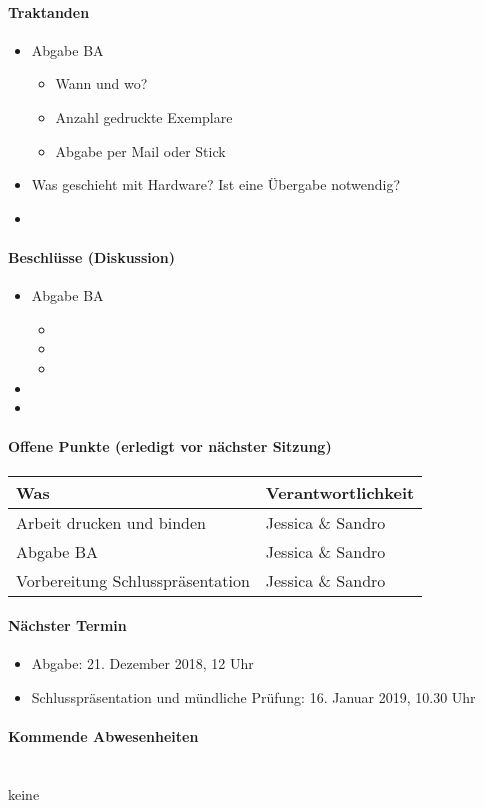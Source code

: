 \paragraph{Traktanden}
\begin{itemize}	
	\item Abgabe BA
	\begin{itemize}
		\item Wann und wo?
		\item Anzahl gedruckte Exemplare
		\item Abgabe per Mail oder Stick
	\end{itemize}	
	\item Was geschieht mit Hardware? Ist eine Übergabe notwendig?
	\item 
\end{itemize}

\paragraph{Beschlüsse (Diskussion)}
\begin{itemize}	
	\item Abgabe BA
	\begin{itemize}
		\item 
		\item 
		\item 
	\end{itemize}	
	\item 
	\item 
\end{itemize}

\paragraph{Offene Punkte (erledigt vor nächster Sitzung)} \mbox{}
\begin{table}[H]
	\centering
	\begin{tabularx}{\textwidth}{X | p{4.5cm}}
		\rowcolor{gray!50}
		\textbf{Was} & \textbf{Verantwortlichkeit} \\
		\hline	
		Arbeit drucken und binden & Jessica \& Sandro \\
		Abgabe BA & Jessica \& Sandro \\
		Vorbereitung Schlusspräsentation & Jessica \& Sandro \\
	\end{tabularx}
	\label{tab:my-label}
\end{table}

\paragraph{Nächster Termin}
\begin{itemize}	
	\item Abgabe: 21. Dezember 2018, 12 Uhr
	\item Schlusspräsentation und mündliche Prüfung: 16. Januar 2019, 10.30 Uhr
\end{itemize}

\paragraph{Kommende Abwesenheiten} \mbox{}\\
keine




